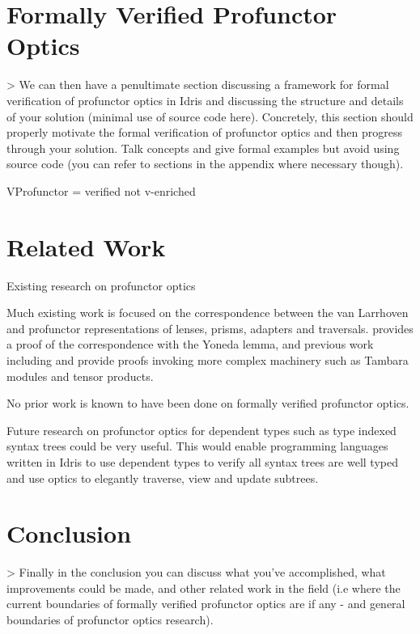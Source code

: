 \documentclass[]{report}
\begin{document}
\section{Formally Verified Profunctor Optics}

> We can then have a penultimate section discussing a framework for formal verification of profunctor optics in Idris and discussing the structure and details of your solution (minimal use of source code here). Concretely, this section should properly motivate the formal verification of profunctor optics and then progress through your solution. Talk concepts and give formal examples but avoid using source code (you can refer to sections in the appendix where necessary though).


VProfunctor = verified not v-enriched


\section{Related Work}

Existing research on profunctor optics

Much existing work is focused on the correspondence between the van Larrhoven and profunctor representations of lenses, prisms, adapters and traversals. \cite{boisseau2018yoneda} provides a proof of the correspondence with the Yoneda lemma, and previous work including \cite{pickering2017profunctor} and \cite{milewski2017profunctor} provide proofs invoking more complex machinery such as Tambara modules and tensor products.

No prior work is known to have been done on formally verified profunctor optics.

Future research on profunctor optics for dependent types such as type indexed syntax trees could be very useful. This would enable programming languages written in Idris to use dependent types to verify all syntax trees are well typed and use optics to elegantly traverse, view and update subtrees.

\section{Conclusion}

> Finally in the conclusion you can discuss what you've accomplished, what improvements could be made, and other related work in the field (i.e where the current boundaries of formally verified profunctor optics are if any - and general boundaries of profunctor optics research).
\end{document}
